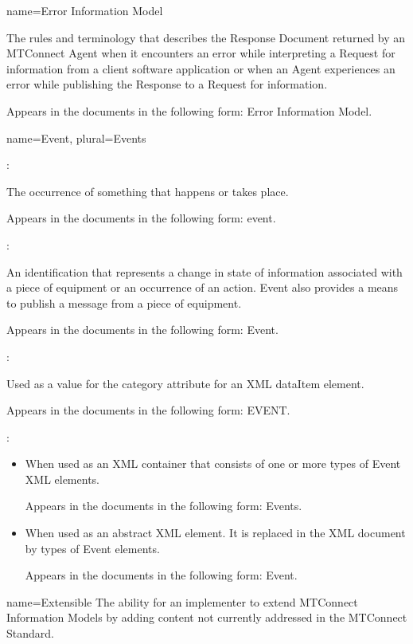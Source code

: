 {
  name={Error Information Model}
}
{
	The rules and terminology that describes the Response Document returned by an MTConnect Agent when it encounters an error while interpreting a Request for information from a client software application or when an Agent experiences an error while publishing the Response to a Request for information.

	Appears in the documents in the following form: Error Information Model.
}


{
  name={Event},
  plural={Events}
}
{
	:

	The occurrence of something that happens or takes place.

	Appears in the documents in the following form: event.

	:

	An identification that represents a change in state of information associated with a piece of equipment or an occurrence of an action.  Event also provides a means to publish a message from a piece of equipment.

	Appears in the documents in the following form: Event.

	:

	Used as a value for the category attribute for an XML dataItem element.

	Appears in the documents in the following form: EVENT.

	:

    \begin{itemize}
	\item When used as an XML container that consists of one or more types of Event XML elements.

	Appears in the documents in the following form: Events.

	\item When used as an abstract XML element.  It is replaced in the XML document by types of Event elements.

	Appears in the documents in the following form: Event.
    \end{itemize}
}


{
  name={Extensible}
}
{
	The ability for an implementer to extend MTConnect Information Models by adding content not currently addressed in the MTConnect Standard.
}


